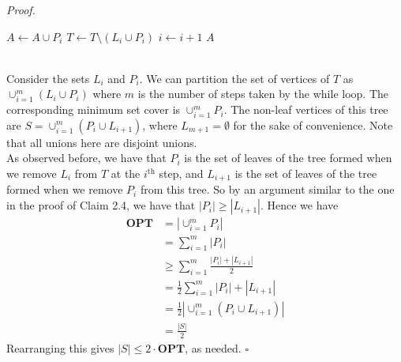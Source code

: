 \documentclass[a4paper]{article}
\newenvironment{proof}{\begin{breakbox}\textit{Proof.}}{\hfill$\square$\end{breakbox}}
\newcommand{\nl}{\vspace{0.2cm}\\}
\newcommand{\OPT}{\mathbf{OPT}}
\begin{document}
\begin{proof}
\begin{algorithmic}[1]
                \State $A \gets A \cup P_i$
                \State $T \gets T \setminus (L_i \cup P_i)$
                \State $i \gets i + 1$
            \EndWhile
            \State \Return $A$
        \EndFunction
    \end{algorithmic}
    \nl
    Consider the sets $L_i$ and $P_i$. We can partition the set of vertices of $T$ as $\cup_{i=1}^m (L_i \cup P_i)$ where $m$ is the number of steps taken by the while loop.
    The corresponding minimum set cover is $\cup_{i=1}^m P_i$.
    The non-leaf vertices of this tree are $S = \cup_{i=1}^m (P_i \cup L_{i+1})$, where $L_{m+1} = \emptyset$ for the sake of convenience. Note that all unions here are disjoint unions.\nl
    As observed before, we have that $P_i$ is the set of leaves of the tree formed when we remove $L_i$ from $T$ at the $i^\mathrm{th}$ step, and $L_{i+1}$ is the set of leaves of the tree
    formed when we remove $P_i$ from this tree. So by an argument similar to the one in the proof of Claim 2.4, we
    have that $|P_i| \ge |L_{i+1}|$. Hence we have
    \begin{align*}
        \OPT &= |\cup_{i=1}^m P_i|\\
             &= \sum_{i=1}^m |P_i|\\
             &\ge \sum_{i=1}^m \frac{|P_i| + |L_{i+1}|}{2}\\
             &= \frac{1}{2} \sum_{i=1}^m |P_i| + |L_{i+1}|\\
             &= \frac{1}{2} |\cup_{i=1}^m (P_i \cup L_{i+1})|\\
             &= \frac{|S|}{2}
    \end{align*}
    Rearranging this gives $|S| \le 2 \cdot \OPT$, as needed.
\end{proof}
\end{document}
